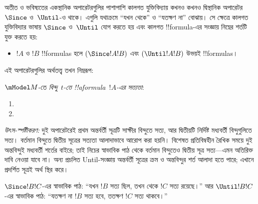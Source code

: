 \documentclass[../../../include/open-logic-section]{subfiles}
\begin{document}


অতীত ও ভবিষ্যতের একস্থানিক অপারেটরগুলির পাশাপাশি কালগত যুক্তিবিদ্যায় কখনও কখনও দ্বিস্থানিক অপারেটর $\Since $ ও~$\Until$-ও থাকে। এগুলি যথাক্রমে ``যখন থেকে'' ও ``যতক্ষণ না'' বোঝায়। সে ক্ষেত্রে কালগত যুক্তিবিদ্যার ভাষায় $\Since $ ও~$\Until$ যোগ করতে হয় এবং কালগত !!{formula}-এর সংজ্ঞায় নিম্নের শর্তটি যুক্ত করতে হয়:

\begin{itemize}
\item[] $!A$ ও $!B$ !!{formula}s হলে $(\Since  !A !B)$ এবং
  $(\Until !A !B)$ উভয়ই !!{formula}s।
\end{itemize}

এই অপারেটরগুলির অর্থতত্ত্ব তখন নিম্নরূপ:

\begin{defn}
  $\mModel M$-তে \emph{বিন্দু~$t$-তে !!a{formula}~$!A$-এর সত্যতা}:
  \begin{enumerate}
  \item{} 
   \item{} 
  \end{enumerate}
\end{defn}
\emph{উৎস-স্পষ্টীকরণ:} দুই অপারেটরেই প্রথম অন্তর্বর্তী সূত্রটি সাক্ষীর বিন্দুতে সত্য, আর দ্বিতীয়টি নির্দিষ্ট মধ্যবর্তী বিন্দুগুলিতে সত্য। বর্তমান বিন্দুতে দ্বিতীয় সূত্রের সত্যতা আলাদাভাবে আরোপ করা হয়নি। বিশেষত প্রতিবিম্বহীন রৈখিক সময়ে দুই অন্তবিন্দুই মধ্যবর্তী শর্তের বাইরে; তাই নিচের স্বাভাবিক পাঠ থেকে বর্তমান বিন্দুতেও দ্বিতীয় সূত্র সত্য—এমন অতিরিক্ত দাবি নেওয়া যাবে না। অন্য প্রচলিত Until-সংজ্ঞায় অন্তর্বর্তী সূত্রের ক্রম ও অন্তবিন্দুর শর্ত আলাদা হতে পারে; এখানে প্রদর্শিত সূত্রই অর্থ স্থির করে।

$\Since  !B !C$-এর স্বাভাবিক পাঠ: ``যখন $!B$ সত্য ছিল, তখন থেকে $!C$ সত্য রয়েছে।'' আর $\Until !B !C$-এর স্বাভাবিক পাঠ: ``যতক্ষণ না $!B$ সত্য হবে, ততক্ষণ $!C$ সত্য থাকবে।''
\end{document}
